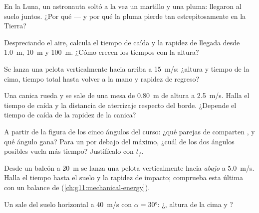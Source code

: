 \begin{exercise}[$\star$]\label{exo:g12:projectile-motion:2}
En la Luna, un astronauta soltó a la vez un martillo y una pluma: llegaron al suelo
juntos. ¿Por qué --- y por qué la pluma pierde tan estrepitosamente en la Tierra?
\end{exercise}

\begin{exercise}[$\star$]\label{exo:g12:projectile-motion:3}
Despreciando el aire, calcula el tiempo de caída y la rapidez de llegada desde
\qty{1.0}{m}, \qty{10}{m} y \qty{100}{m}. ¿Cómo crecen los tiempos con la altura?
\end{exercise}

\begin{exercise}[$\star$]\label{exo:g12:projectile-motion:4}
Se lanza una pelota verticalmente hacia arriba a \qty{15}{m/s}: ¿altura y tiempo de la
cima, tiempo total hasta volver a la mano y rapidez de regreso?
\end{exercise}

\begin{exercise}[$\star$]\label{exo:g12:projectile-motion:5}
Una canica rueda y se sale de una mesa de \qty{0.80}{m} de altura a \qty{2.5}{m/s}.
Halla el tiempo de caída y la distancia de aterrizaje respecto del borde. ¿Depende el
tiempo de caída de la rapidez de la canica?
\end{exercise}

\begin{exercise}[$\star\star$]\label{exo:g12:projectile-motion:6}
A partir de la figura de los cinco ángulos del curso: ¿qué parejas de 
comparten , y qué ángulo gana? Para un  por debajo del máximo, ¿cuál de
los dos ángulos posibles vuela más tiempo? Justifícalo con $t_f$.
\end{exercise}

\begin{exercise}[$\star\star$]\label{exo:g12:projectile-motion:7}
Desde un balcón a \qty{20}{m} se lanza una pelota verticalmente hacia \emph{abajo} a
\qty{5.0}{m/s}. Halla el tiempo hasta el suelo y la rapidez de impacto; comprueba esta
última con un balance de  (\cref{ch:g11:mechanical-energy}).
\end{exercise}

\begin{exercise}[$\star\star$]\label{exo:g12:projectile-motion:8}
Un  sale del suelo horizontal a \qty{40}{m/s} con $\alpha = \ang{30}$:
¿, altura de la cima y ?
\end{exercise}

